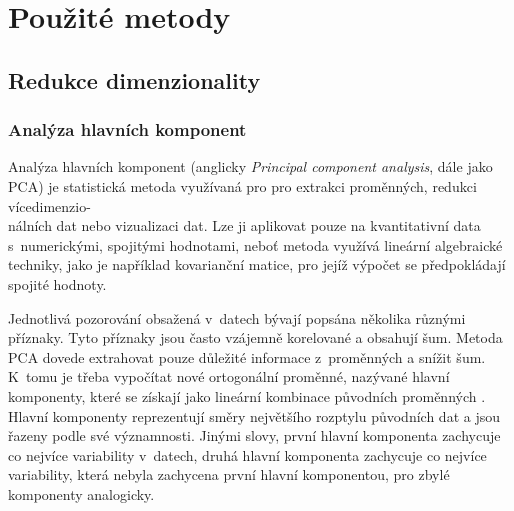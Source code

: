 \chapter{Použité metody}




\section{Redukce dimenzionality} %

\subsection{Analýza hlavních komponent}

Analýza hlavních komponent (anglicky \emph{Principal component analysis}, dále jako PCA) je statistická metoda využívaná pro pro extrakci proměnných, redukci vícedimenzio-\\nálních dat nebo vizualizaci dat. Lze ji aplikovat pouze na kvantitativní data s~numerickými, spojitými hodnotami, neboť metoda využívá lineární algebraické techniky, jako je například kovarianční matice, pro jejíž výpočet se předpokládají spojité hodnoty. 

Jednotlivá pozorování obsažená v~datech bývají popsána několika různými příznaky. Tyto příznaky jsou často vzájemně korelované a obsahují šum. Metoda PCA dovede extrahovat pouze důležité informace z~proměnných a snížit šum. K~tomu je třeba vypočítat nové ortogonální proměnné, nazývané hlavní komponenty, které se získají jako lineární kombinace původních proměnných \cite{bib:PCA1}. Hlavní komponenty reprezentují směry největšího rozptylu původních dat a jsou řazeny podle své významnosti. Jinými slovy, první hlavní komponenta zachycuje co nejvíce variability v~datech, druhá hlavní komponenta zachycuje co nejvíce variability, která nebyla zachycena první hlavní komponentou, pro zbylé komponenty analogicky. \cite{bib:PCA3}

